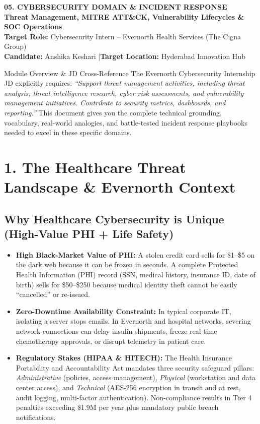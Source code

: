\documentclass[10pt,a4paper]{article}
\begin{document}
\begin{center}
    {\Huge \textbf{\color{primary}05. CYBERSECURITY DOMAIN \& INCIDENT RESPONSE}}\\[5pt]
    {\Large \textbf{\color{secondary}Threat Management, MITRE ATT\&CK, Vulnerability Lifecycles \& SOC Operations}}\\[4pt]
    \textbf{Target Role:} Cybersecurity Intern -- Evernorth Health Services (The Cigna Group)\\[2pt]
    \textbf{Candidate:} Anshika Keshari \quad|\quad \textbf{Target Location:} Hyderabad Innovation Hub
\end{center}

\vspace{0.2cm}

\begin{calloutbox}{Module Overview \& JD Cross-Reference}
The Evernorth Cybersecurity Internship JD explicitly requires: \textit{``Support threat management activities, including threat analysis, threat intelligence research, cyber risk assessments, and vulnerability management initiatives. Contribute to security metrics, dashboards, and reporting.''} This document gives you the complete technical grounding, vocabulary, real-world analogies, and battle-tested incident response playbooks needed to excel in these specific domains.
\end{calloutbox}

\section{1. The Healthcare Threat Landscape \& Evernorth Context}

\subsection{Why Healthcare Cybersecurity is Unique (High-Value PHI + Life Safety)}
\begin{itemize}[noitemsep]
    \item \textbf{High Black-Market Value of PHI:} A stolen credit card sells for \$1--\$5 on the dark web because it can be frozen in seconds. A complete Protected Health Information (PHI) record (SSN, medical history, insurance ID, date of birth) sells for \$50--\$250 because medical identity theft cannot be easily ``cancelled'' or re-issued.
    \item \textbf{Zero-Downtime Availability Constraint:} In typical corporate IT, isolating a server stops emails. In Evernorth and hospital networks, severing network connections can delay insulin shipments, freeze real-time chemotherapy approvals, or disrupt telemetry in patient care.
    \item \textbf{Regulatory Stakes (HIPAA \& HITECH):} The Health Insurance Portability and Accountability Act mandates three security safeguard pillars: \textit{Administrative} (policies, access management), \textit{Physical} (workstation and data center access), and \textit{Technical} (AES-256 encryption in transit and at rest, audit logging, multi-factor authentication). Non-compliance results in Tier 4 penalties exceeding \$1.9M per year plus mandatory public breach notifications.
\end{itemize}
\end{document}
